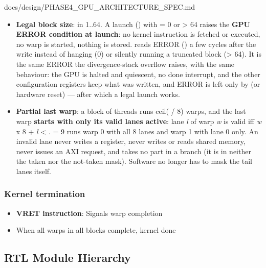 \begin{relocated}{docs/design/PHASE4_GPU_ARCHITECTURE_SPEC.md}
\begin{itemize}
\tightlist
\item
  \textbf{Legal block size}:  in 1..64. A launch
  () with  = 0 or
   \textgreater{} 64 raises the \textbf{GPU ERROR
  condition at launch}: no kernel instruction is fetched or executed, no
  warp is started, nothing is stored.  reads ERROR
  () a few cycles after the  write instead of
  hanging (0) or silently running a truncated block (\textgreater{} 64).
  It is the same ERROR the divergence-stack overflow raises, with the
  same behaviour: the GPU is halted and quiescent, no done interrupt,
   and the other configuration registers keep what was
  written, and ERROR is left only by  (or hardware
  reset) --- after which a legal launch works.
\item
  \textbf{Partial last warp}: a block of  threads runs
  ceil( / 8) warps, and the last warp \textbf{starts
  with only its valid lanes active}: lane \emph{l} of warp \emph{w} is
  valid iff \emph{w} x 8 + \emph{l} \textless{} .
   = 9 runs warp 0 with all 8 lanes and warp 1 with
  lane 0 only. An invalid lane never writes a register, never writes or
  reads shared memory, never issues an AXI request, and takes no part in
  a branch (it is in neither the taken nor the not-taken mask). Software
  no longer has to mask the tail lanes itself.
\end{itemize}

\subsubsection{Kernel termination}\label{ds:ch:phase4-gpu-architecture:kernel-termination}

\begin{itemize}
\tightlist
\item
  \textbf{VRET instruction}: Signals warp completion
\item
  When all warps in all blocks complete, kernel done
\end{itemize}

\subsection{RTL Module Hierarchy}\label{ds:ch:phase4-gpu-architecture:rtl-module-hierarchy}


\end{relocated}
